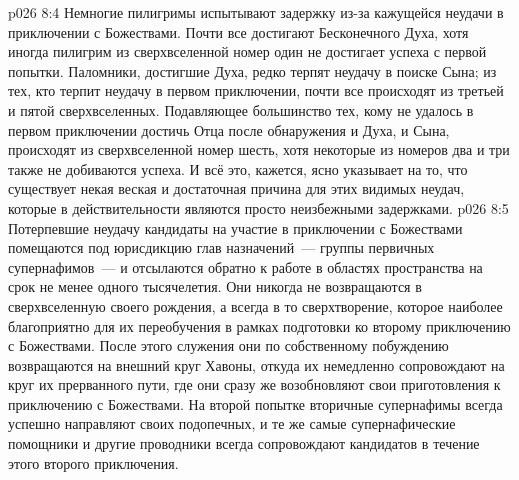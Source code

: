 \vs p026 8:4 \pc Немногие пилигримы испытывают задержку из-за кажущейся неудачи в приключении с Божествами. Почти все достигают Бесконечного Духа, хотя иногда пилигрим из сверхвселенной номер один не достигает успеха с первой попытки. Паломники, достигшие Духа, редко терпят неудачу в поиске Сына; из тех, кто терпит неудачу в первом приключении, почти все происходят из третьей и пятой сверхвселенных. Подавляющее большинство тех, кому не удалось в первом приключении достичь Отца после обнаружения и Духа, и Сына, происходят из сверхвселенной номер шесть, хотя некоторые из номеров два и три также не добиваются успеха. И всё это, кажется, ясно указывает на то, что существует некая веская и достаточная причина для этих видимых неудач, которые в действительности являются просто неизбежными задержками.
\vs p026 8:5 Потерпевшие неудачу кандидаты на участие в приключении с Божествами помещаются под юрисдикцию глав назначений~--- группы первичных супернафимов~--- и отсылаются обратно к работе в областях пространства на срок не менее одного тысячелетия. Они никогда не возвращаются в сверхвселенную своего рождения, а всегда в то сверхтворение, которое наиболее благоприятно для их переобучения в рамках подготовки ко второму приключению с Божествами. После этого служения они по собственному побуждению возвращаются на внешний круг Хавоны, откуда их немедленно сопровождают на круг их прерванного пути, где они сразу же возобновляют свои приготовления к приключению с Божествами. На второй попытке вторичные супернафимы всегда успешно направляют своих подопечных, и те же самые супернафические помощники и другие проводники всегда сопровождают кандидатов в течение этого второго приключения.
